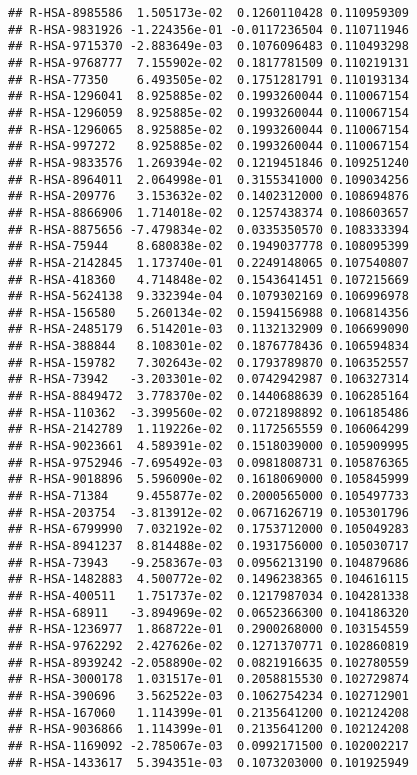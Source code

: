 \documentclass[
]{article}
\begin{document}
\begin{verbatim}
## R-HSA-8985586  1.505173e-02  0.1260110428 0.110959309
## R-HSA-9831926 -1.224356e-01 -0.0117236504 0.110711946
## R-HSA-9715370 -2.883649e-03  0.1076096483 0.110493298
## R-HSA-9768777  7.155902e-02  0.1817781509 0.110219131
## R-HSA-77350    6.493505e-02  0.1751281791 0.110193134
## R-HSA-1296041  8.925885e-02  0.1993260044 0.110067154
## R-HSA-1296059  8.925885e-02  0.1993260044 0.110067154
## R-HSA-1296065  8.925885e-02  0.1993260044 0.110067154
## R-HSA-997272   8.925885e-02  0.1993260044 0.110067154
## R-HSA-9833576  1.269394e-02  0.1219451846 0.109251240
## R-HSA-8964011  2.064998e-01  0.3155341000 0.109034256
## R-HSA-209776   3.153632e-02  0.1402312000 0.108694876
## R-HSA-8866906  1.714018e-02  0.1257438374 0.108603657
## R-HSA-8875656 -7.479834e-02  0.0335350570 0.108333394
## R-HSA-75944    8.680838e-02  0.1949037778 0.108095399
## R-HSA-2142845  1.173740e-01  0.2249148065 0.107540807
## R-HSA-418360   4.714848e-02  0.1543641451 0.107215669
## R-HSA-5624138  9.332394e-04  0.1079302169 0.106996978
## R-HSA-156580   5.260134e-02  0.1594156988 0.106814356
## R-HSA-2485179  6.514201e-03  0.1132132909 0.106699090
## R-HSA-388844   8.108301e-02  0.1876778436 0.106594834
## R-HSA-159782   7.302643e-02  0.1793789870 0.106352557
## R-HSA-73942   -3.203301e-02  0.0742942987 0.106327314
## R-HSA-8849472  3.778370e-02  0.1440688639 0.106285164
## R-HSA-110362  -3.399560e-02  0.0721898892 0.106185486
## R-HSA-2142789  1.119226e-02  0.1172565559 0.106064299
## R-HSA-9023661  4.589391e-02  0.1518039000 0.105909995
## R-HSA-9752946 -7.695492e-03  0.0981808731 0.105876365
## R-HSA-9018896  5.596090e-02  0.1618069000 0.105845999
## R-HSA-71384    9.455877e-02  0.2000565000 0.105497733
## R-HSA-203754  -3.813912e-02  0.0671626719 0.105301796
## R-HSA-6799990  7.032192e-02  0.1753712000 0.105049283
## R-HSA-8941237  8.814488e-02  0.1931756000 0.105030717
## R-HSA-73943   -9.258367e-03  0.0956213190 0.104879686
## R-HSA-1482883  4.500772e-02  0.1496238365 0.104616115
## R-HSA-400511   1.751737e-02  0.1217987034 0.104281338
## R-HSA-68911   -3.894969e-02  0.0652366300 0.104186320
## R-HSA-1236977  1.868722e-01  0.2900268000 0.103154559
## R-HSA-9762292  2.427626e-02  0.1271370771 0.102860819
## R-HSA-8939242 -2.058890e-02  0.0821916635 0.102780559
## R-HSA-3000178  1.031517e-01  0.2058815530 0.102729874
## R-HSA-390696   3.562522e-03  0.1062754234 0.102712901
## R-HSA-167060   1.114399e-01  0.2135641200 0.102124208
## R-HSA-9036866  1.114399e-01  0.2135641200 0.102124208
## R-HSA-1169092 -2.785067e-03  0.0992171500 0.102002217
## R-HSA-1433617  5.394351e-03  0.1073203000 0.101925949

\end{verbatim}
\end{document}
